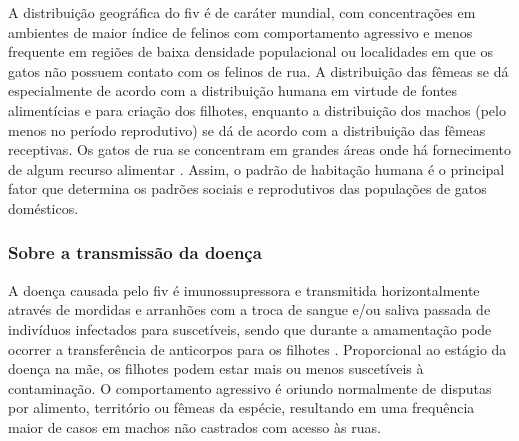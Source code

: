 \documentclass{article}
\begin{document}
\noindent A distribuição geográfica do \gls{fiv} é de caráter mundial, com concentrações em ambientes de maior índice de felinos com comportamento agressivo e menos frequente em regiões de baixa densidade populacional ou localidades em que os gatos não possuem contato com os felinos de rua. A distribuição das fêmeas se dá especialmente de acordo com a distribuição humana em virtude de fontes alimentícias e para criação dos filhotes, enquanto a distribuição dos machos (pelo menos no período reprodutivo) se dá de acordo com a distribuição das fêmeas receptivas. Os gatos de rua se concentram em grandes áreas onde há fornecimento de algum recurso alimentar \cite{base}. Assim, o padrão de habitação humana é o
principal fator que determina os padrões sociais e
reprodutivos das populações de gatos domésticos.\cite{base}\\

\subsubsection{Sobre a transmissão da doença}
\noindent A doença causada pelo \gls{fiv} é imunossupressora e  transmitida horizontalmente através de mordidas e arranhões com a troca de sangue e/ou saliva passada de indivíduos infectados para suscetíveis, sendo que durante a amamentação pode ocorrer a transferência de anticorpos para os filhotes \cite{rayane}. Proporcional ao estágio da doença na mãe, os filhotes podem estar mais ou menos suscetíveis à contaminação. O comportamento agressivo é oriundo normalmente de disputas por alimento, território ou fêmeas da espécie, resultando em uma frequência maior de casos em machos não castrados com acesso às ruas.\\
\end{document}
